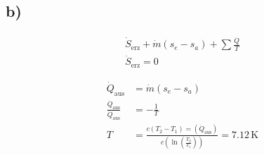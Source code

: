 

\subsection*{b)}
\begin{align*}
\dot{S}_{\text{erz}} + \dot{m} (s_e - s_a) + \sum \frac{\dot{Q}}{T} \\
\dot{S}_{\text{erz}} = 0
\end{align*}

\begin{align*}
\dot{Q}_{\text{aus}} &= \dot{m} (s_e - s_a) \\
\frac{\dot{Q}_{\text{aus}}}{\dot{Q}_{\text{aus}}} &= -\frac{1}{T} \\
T &= \frac{c (T_2 - T_1) = (\dot{Q}_{\text{aus}})}{c (\ln (\frac{T_2}{T_1}))} = 7.12 \, \text{K}
\end{align*}